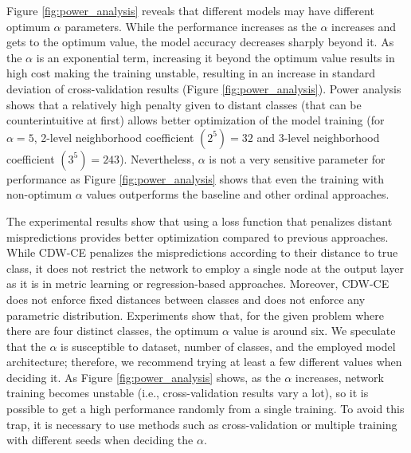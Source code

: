 \documentclass[runningheads]{llncs}
\begin{document}
Figure \ref{fig:power_analysis} reveals that different models may have different optimum $\alpha$ parameters. While the performance increases as the $\alpha$ increases and gets to the optimum value, the model accuracy decreases sharply beyond it. As the $\alpha$ is an exponential term, increasing it beyond the optimum value results in high cost making the training unstable, resulting in an increase in standard deviation of cross-validation results (Figure \ref{fig:power_analysis}). Power analysis shows that a relatively high penalty given to distant classes (that can be counterintuitive at first) allows better optimization of the model training (for $\alpha=5$,  2-level neighborhood coefficient $(2^5)=32$ and 3-level neighborhood coefficient $(3^5)=243$). Nevertheless, $\alpha$ is not a very sensitive parameter for performance as Figure \ref{fig:power_analysis} shows that even the training with non-optimum $\alpha$ values outperforms the baseline and other ordinal approaches.

The experimental results show that using a loss function that penalizes distant mispredictions provides better optimization compared to previous approaches. While CDW-CE penalizes the mispredictions according to their distance to true class, it does not restrict the network to employ a single node at the output layer as it is in metric learning or regression-based approaches. Moreover, CDW-CE does not enforce fixed distances between classes and does not enforce any parametric distribution. Experiments show that, for the given problem where there are four distinct classes, the optimum $\alpha$ value is around six. We speculate that the $\alpha$ is susceptible to dataset, number of classes, and the employed model architecture; therefore, we recommend trying at least a few different values when deciding it. As Figure \ref{fig:power_analysis} shows, as the $\alpha$ increases, network training becomes unstable (i.e., cross-validation results vary a lot), so it is possible to get a high performance randomly from a single training. To avoid this trap, it is necessary to use methods such as cross-validation or multiple training with different seeds when deciding the $\alpha$.
\end{document}

